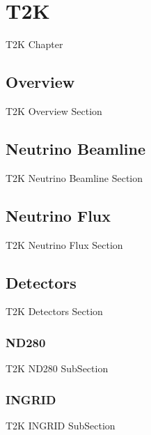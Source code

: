 \chapter{T2K}
\label{chap:T2K}
T2K Chapter

\section{Overview}
\label{sec:T2K_Overview}
T2K Overview Section

\section{Neutrino Beamline}
\label{sec:T2K_Beamline}
T2K Neutrino Beamline Section

\section{Neutrino Flux}
\label{sec:T2K_NeutrinoFlux}
T2K Neutrino Flux Section

\section{Detectors}
\label{sec:T2K_Detectors}
T2K Detectors Section

\subsection{ND280}
\label{sec:T2K_ND280}
T2K ND280 SubSection

\subsection{INGRID}
\label{sec:T2K_INGRID}
T2K INGRID SubSection

